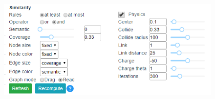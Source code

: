 \documentclass[12pt]{article}
\begin{document}
\begin{figure}[H]
    \centering
    \includegraphics[width=\textwidth]{figures/B-graph.png}
\end{figure}
\end{document}
